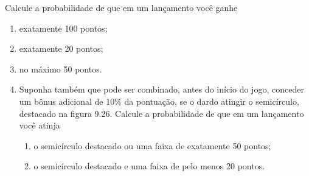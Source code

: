 Calcule a probabilidade de que em um lançamento você ganhe
\begin{enumerate}
\item {} 
exatamente 100 pontos;

\item {} 
exatamente 20 pontos;

\item {} 
no máximo 50 pontos.

\item {} 
Suponha também que pode ser combinado, antes do início do jogo, conceder um bônus adicional de 10\% da pontuação, se o dardo atingir o semicírculo, destacado na figura 9.26. Calcule a probabilidade de que em um lançamento você atinja
\begin{enumerate}
\item {} 
o semicírculo destacado ou uma faixa de exatamente 50 pontos;

\item {} 
o semicírculo destacado e uma faixa de pelo menos 20 pontos.

\end{enumerate}

\end{enumerate}
